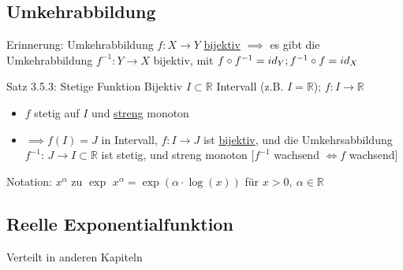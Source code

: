 \documentclass[a4paper,10pt]{article}
\begin{document}
\subsection{Umkehrabbildung}
\begin{bembox}
    {Erinnerung: Umkehrabbildung}
    $f:X\longrightarrow Y$ \underline{bijektiv} $\implies$ es gibt die Umkehrabbildung $f^{-1}:Y\longrightarrow X$ bijektiv, mit $f\circ f^{-1} = id_Y;
    \\f^{-1}\circ f= id_X$
\end{bembox}
\begin{tbox}
    {Satz 3.5.3: Stetige Funktion Bijektiv}
    $I\subset \mathbb R$ Intervall (z.B. $I=\mathbb R$); $f:I\longrightarrow \mathbb R$
    \begin{itemize}
        \item $f$ stetig auf $I$ und \underline{streng} monoton
        \item $\implies f(I) = J$ in Intervall, $f:I\longrightarrow J$ ist \underline{bijektiv}, und die Umkehrsabbildung $f^{-1}$: $J\longrightarrow I\subset \mathbb R$ ist stetig, und streng monoton [$f^{-1}$ wachsend $\iff f$ wachsend]
    \end{itemize}
\end{tbox}
\begin{bembox}
    {Notation: $x^\alpha$ zu $\exp$}
    $x^\alpha=\exp(\alpha\cdot\log(x))$ für $x>0,\ \alpha\in\mathbb R$
\end{bembox}
\subsection{Reelle Exponentialfunktion}
Verteilt in anderen Kapiteln
\end{document}
